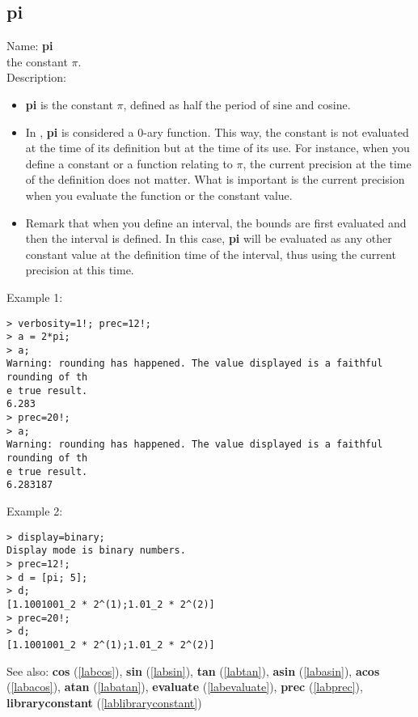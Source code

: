 \subsection{pi}
\label{labpi}
\noindent Name: \textbf{pi}\\
the constant $\pi$.\\
\noindent Description: \begin{itemize}

\item \textbf{pi} is the constant $\pi$, defined as half the period of sine and cosine.

\item In \sollya, \textbf{pi} is considered a 0-ary function. This way, the constant 
   is not evaluated at the time of its definition but at the time of its use. For 
   instance, when you define a constant or a function relating to $\pi$, the current
   precision at the time of the definition does not matter. What is important is 
   the current precision when you evaluate the function or the constant value.

\item Remark that when you define an interval, the bounds are first evaluated and 
   then the interval is defined. In this case, \textbf{pi} will be evaluated as any 
   other constant value at the definition time of the interval, thus using the 
   current precision at this time.
\end{itemize}
\noindent Example 1: 
\begin{center}\begin{minipage}{15cm}\begin{Verbatim}[frame=single]
> verbosity=1!; prec=12!;
> a = 2*pi;
> a;
Warning: rounding has happened. The value displayed is a faithful rounding of th
e true result.
6.283
> prec=20!;
> a;
Warning: rounding has happened. The value displayed is a faithful rounding of th
e true result.
6.283187
\end{Verbatim}
\end{minipage}\end{center}
\noindent Example 2: 
\begin{center}\begin{minipage}{15cm}\begin{Verbatim}[frame=single]
> display=binary;
Display mode is binary numbers.
> prec=12!;
> d = [pi; 5];
> d;
[1.1001001_2 * 2^(1);1.01_2 * 2^(2)]
> prec=20!;
> d;
[1.1001001_2 * 2^(1);1.01_2 * 2^(2)]
\end{Verbatim}
\end{minipage}\end{center}
See also: \textbf{cos} (\ref{labcos}), \textbf{sin} (\ref{labsin}), \textbf{tan} (\ref{labtan}), \textbf{asin} (\ref{labasin}), \textbf{acos} (\ref{labacos}), \textbf{atan} (\ref{labatan}), \textbf{evaluate} (\ref{labevaluate}), \textbf{prec} (\ref{labprec}), \textbf{libraryconstant} (\ref{lablibraryconstant})
